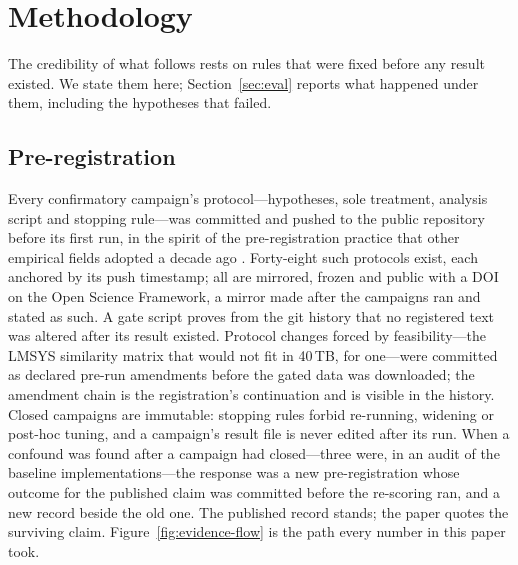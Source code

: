 \section{Methodology}
\label{sec:method}

The credibility of what follows rests on rules that were fixed before any
result existed. We state them here; Section~\ref{sec:eval} reports what
happened under them, including the hypotheses that failed.

\subsection{Pre-registration}
\label{sec:method-prereg}

Every confirmatory campaign's protocol---hypotheses, sole treatment,
analysis script and stopping rule---was committed and pushed to the public
repository before its first run, in the spirit of the pre-registration
practice that other empirical fields adopted a decade ago
\citep{nosek2018prereg}. Forty-eight such protocols exist, each anchored by
its push timestamp; all are mirrored, frozen and public with a DOI on the
Open Science Framework, a mirror made after the campaigns ran and stated
as such. A gate script proves from the git history that no registered text
was altered after its result existed. Protocol changes forced by
feasibility---the LMSYS similarity matrix that would not fit in 40\,TB, for
one---were committed as declared pre-run amendments before the gated data
was downloaded; the amendment chain is the registration's continuation and
is visible in the history. Closed campaigns are immutable: stopping rules
forbid re-running, widening or post-hoc tuning, and a campaign's result
file is never edited after its run. When a confound was found after a
campaign had closed---three were, in an audit of the baseline
implementations---the response was a new pre-registration whose outcome
for the published claim was committed before the re-scoring ran, and a new
record beside the old one. The published record stands; the paper quotes
the surviving claim. Figure~\ref{fig:evidence-flow} is the path every
number in this paper took.

